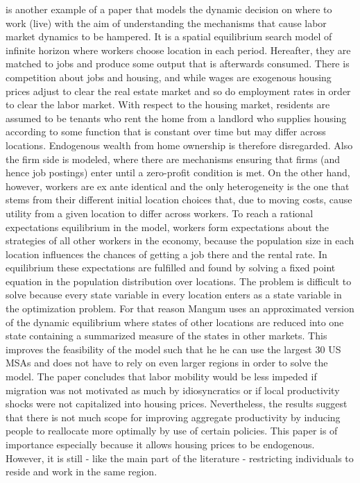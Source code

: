 \citet{Mangum2015} is another example of a paper that models the dynamic decision on where to work (live) with the aim of understanding the mechanisms that cause labor market dynamics to be hampered. It is a spatial equilibrium search model of infinite horizon where workers choose location in each period. Hereafter, they are matched to jobs and produce some output that is afterwards consumed. There is competition about jobs and housing, and while wages are exogenous housing prices adjust to clear the real estate market and so do employment rates in order to clear the labor market. With respect to the housing market, residents are assumed to be tenants who rent the home from a landlord who supplies housing according to some function that is constant over time but may differ across locations. Endogenous wealth from home ownership is therefore disregarded. Also the firm side is modeled, where there are mechanisms ensuring that firms (and hence job postings) enter until a zero-profit condition is met. On the other hand, however, workers are ex ante identical and the only heterogeneity is the one that stems from their different initial location choices that, due to moving costs, cause utility from a given location to differ across workers. To reach a rational expectations equilibrium in the model, workers form expectations about the strategies of all other workers in the economy, because the population size in each location influences the chances of getting a job there and the rental rate. In equilibrium these expectations are fulfilled and found by solving a fixed point equation in the population distribution over locations. The problem is difficult to solve because every state variable in every location enters as a state variable in the optimization problem. For that reason Mangum uses an approximated version of the dynamic equilibrium where states of other locations are reduced into one state containing a summarized measure of the states in other markets. This improves the feasibility of the model such that he he can use the largest 30 US MSAs and does not have to rely on even larger regions in order to solve the model. The paper concludes that labor mobility would be less impeded if migration was not motivated as much by idiosyncratics or if local productivity shocks were not capitalized into housing prices. Nevertheless, the results suggest that there is not much scope for improving aggregate productivity by inducing people to reallocate more optimally by use of certain policies. This paper is of importance especially because it allows housing prices to be endogenous. However, it is still - like the main part of the literature - restricting individuals to reside and work in the same region. 


